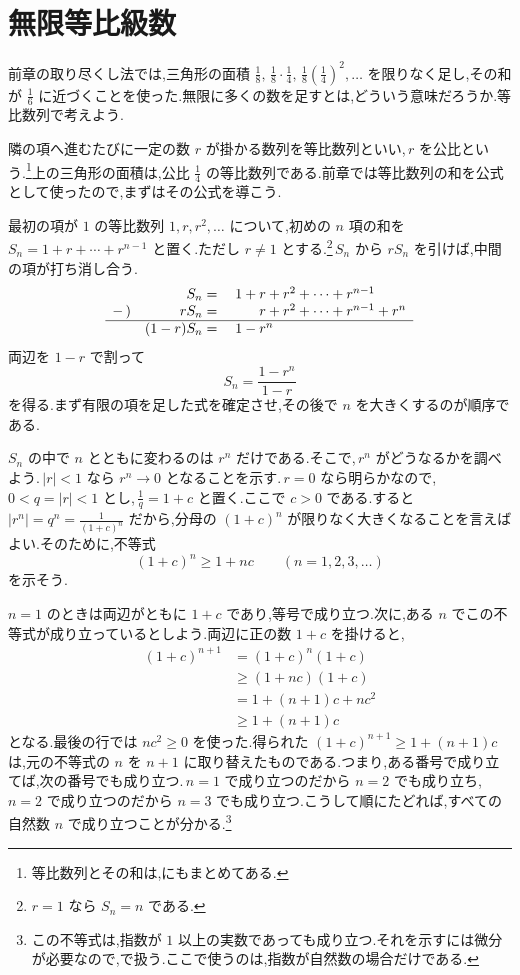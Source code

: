 \section{無限等比級数}\label{節:等比級数}
前章の取り尽くし法では,三角形の面積 $\frac18,\,\frac18\cdot\frac14,\,\frac18\left(\frac14\right)^2,\ldots$ を限りなく足し,その和が $\frac16$ に近づくことを使った.無限に多くの数を足すとは,どういう意味だろうか.等比数列で考えよう.

隣の項へ進むたびに一定の数 $r$ が掛かる数列を等比数列といい,\,$r$ を公比という.\footnote{等比数列とその和は,にもまとめてある.}上の三角形の面積は,公比 $\frac14$ の等比数列である.前章では等比数列の和を公式として使ったので,まずはその公式を導こう.

最初の項が $1$ の等比数列 $1,r,r^2,\ldots$ について,初めの $n$ 項の和を $S_n=1+r+\cdots+r^{n-1}$ と置く.ただし $r\ne1$ とする.\footnote{$r=1$ なら $S_n=n$ である.}\,$S_n$ から $rS_n$ を引けば,中間の項が打ち消し合う.
\[
 \begin{array}{rrl}
  &S_n={}&1+r+r^2+\cdots+r^{n-1}\\
  -\,)&rS_n={}&\phantom{1+{}}r+r^2+\cdots+r^{n-1}+r^n\\ \hline
  &(1-r)S_n={}&1-r^n
 \end{array}
\]
両辺を $1-r$ で割って
\[
 S_n=\frac{1-r^n}{1-r}
\]
を得る.まず有限の項を足した式を確定させ,その後で $n$ を大きくするのが順序である.

$S_n$ の中で $n$ とともに変わるのは $r^n$ だけである.そこで,\,$r^n$ がどうなるかを調べよう.\,$|r|<1$ なら $r^n\to0$ となることを示す.\,$r=0$ なら明らかなので,\,$0<q=|r|<1$ とし,\,$\frac1q=1+c$ と置く.ここで $c>0$ である.すると $|r^n|=q^n=\frac1{(1+c)^n}$ だから,分母の $(1+c)^n$ が限りなく大きくなることを言えばよい.そのために,不等式
\[
 (1+c)^n\ge1+nc\qquad(n=1,2,3,\ldots)
\]
を示そう.

$n=1$ のときは両辺がともに $1+c$ であり,等号で成り立つ.次に,ある $n$ でこの不等式が成り立っているとしよう.両辺に正の数 $1+c$ を掛けると,
\begin{align*}
 (1+c)^{n+1}&=(1+c)^n(1+c)\\
 &\ge(1+nc)(1+c)\\
 &=1+(n+1)c+nc^2\\
 &\ge1+(n+1)c
\end{align*}
となる.最後の行では $nc^2\ge0$ を使った.得られた $(1+c)^{n+1}\ge1+(n+1)c$ は,元の不等式の $n$ を $n+1$ に取り替えたものである.つまり,ある番号で成り立てば,次の番号でも成り立つ.\,$n=1$ で成り立つのだから $n=2$ でも成り立ち,\,$n=2$ で成り立つのだから $n=3$ でも成り立つ.こうして順にたどれば,すべての自然数 $n$ で成り立つことが分かる.\footnote{この不等式は,指数が $1$ 以上の実数であっても成り立つ.それを示すには微分が必要なので,で扱う.ここで使うのは,指数が自然数の場合だけである.}

